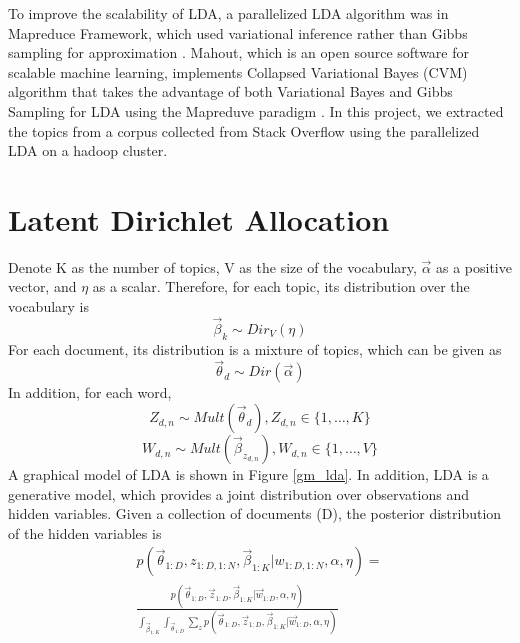 \documentclass[conference]{IEEEtran}
\begin{document}
To improve the scalability of LDA, a parallelized LDA algorithm was in Mapreduce Framework, which used variational inference rather than Gibbs sampling for approximation \cite{zhai2012mr}. Mahout, which is an open source software for scalable machine learning, implements Collapsed Variational Bayes (CVM) algorithm that takes the advantage of both Variational Bayes and Gibbs Sampling for LDA using the Mapreduve paradigm \cite{mahout_lda}. In this project, we extracted the topics from a corpus collected from Stack Overflow using the parallelized LDA on a hadoop cluster. 

\section{Latent Dirichlet Allocation}

Denote K as the number of topics, V as the size of the vocabulary, $\overrightarrow{\alpha}$ as a positive vector, and $\eta$ as a scalar. Therefore, for each topic, its distribution over the vocabulary is
\begin{equation}
\overrightarrow{\beta}_k \sim Dir_V(\eta)
\end{equation}
For each document, its distribution is a mixture of topics, which can be given as
\begin{equation}
\overrightarrow{\theta}_d \sim Dir(\overrightarrow{\alpha})
\end{equation}
In addition, for each word, 
\begin{equation}
Z_{d,n} \sim Mult(\overrightarrow{\theta}_d), Z_{d,n} \in \{1,\ldots, K\}
\end{equation}
\begin{equation}
W_{d,n} \sim Mult(\overrightarrow{\beta}_{z_{d,n}}), W_{d,n} \in \{1,\ldots,V\} 
\end{equation}
A graphical model of LDA is shown in Figure \ref{gm_lda}. In addition, LDA is a generative model, which provides a joint distribution over observations and hidden variables. Given a collection of documents (D), the posterior distribution of the hidden variables is
\begin{equation}
\begin{split}
p(\overrightarrow{\theta}_{1:D},z_{1:D,1:N},\overrightarrow{\beta}_{1:K}|w_{1:D,1:N},\alpha,\eta)= \\[10pt]
\frac{p(\overrightarrow{\theta}_{1:D},\overrightarrow{z}_{1:D},\overrightarrow{\beta}_{1:K}|\overrightarrow{w}_{1:D},\alpha,\eta)}{\int_{\overrightarrow{\beta}_{1:K}}\int_{\overrightarrow{\theta}_{1:D}}\sum_{z}{p(\overrightarrow{\theta}_{1:D},\overrightarrow{z}_{1:D},\overrightarrow{\beta}_{1:K}|\overrightarrow{w}_{1:D},\alpha,\eta)}}
\end{split}
\end{equation} 
\end{document}
